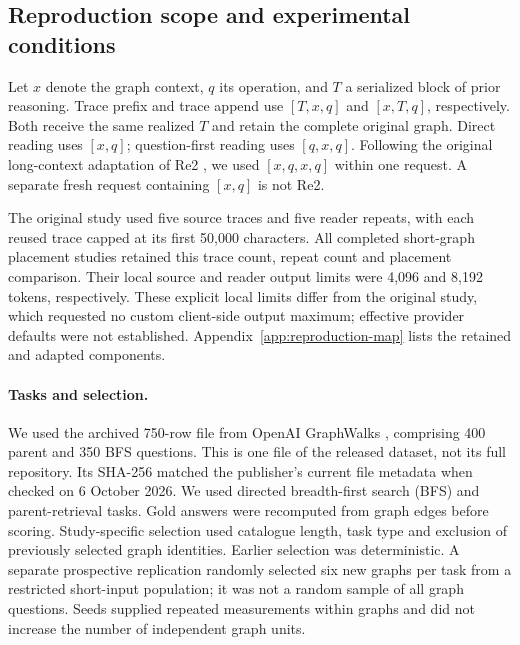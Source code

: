 \subsection{Reproduction scope and experimental conditions}
Let $x$ denote the graph context, $q$ its operation, and $T$ a serialized block of prior reasoning. Trace prefix and trace append use $[T,x,q]$ and $[x,T,q]$, respectively. Both receive the same realized $T$ and retain the complete original graph. Direct reading uses $[x,q]$; question-first reading uses $[q,x,q]$. Following the original long-context adaptation of Re2 \citep{tang2026trace,xu2024rereading}, we used $[x,q,x,q]$ within one request. A separate fresh request containing $[x,q]$ is not Re2.

The original study used five source traces and five reader repeats, with each reused trace capped at its first 50,000 characters. All completed short-graph placement studies retained this trace count, repeat count and placement comparison. Their local source and reader output limits were 4,096 and 8,192 tokens, respectively. These explicit local limits differ from the original study, which requested no custom client-side output maximum; effective provider defaults were not established. Appendix~\ref{app:reproduction-map} lists the retained and adapted components.

\paragraph{Tasks and selection.} We used the archived 750-row \protect{} file from OpenAI GraphWalks \citep{openai2025graphwalks}, comprising 400 parent and 350 BFS questions. This is one file of the released dataset, not its full repository. Its SHA-256 matched the publisher's current file metadata when checked on 6 October 2026. We used directed breadth-first search (BFS) and parent-retrieval tasks. Gold answers were recomputed from graph edges before scoring. Study-specific selection used catalogue length, task type and exclusion of previously selected graph identities. Earlier selection was deterministic. A separate prospective replication randomly selected six new graphs per task from a restricted short-input population; it was not a random sample of all graph questions. Seeds supplied repeated measurements within graphs and did not increase the number of independent graph units.

